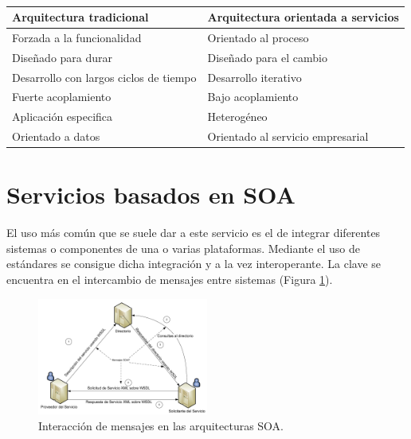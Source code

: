 \documentclass[conference]{IEEEtran}
\begin{document}
\begin{table}[!t]
  \renewcommand{\arraystretch}{1.3}
  \caption{}
  \label{tab:soa-vs-trad}
  \centering
  \begin{tabular}{|l|l|}
    \hline
    \textbf{Arquitectura tradicional} & \textbf{Arquitectura orientada
      a servicios}\\
    \hline\hline
    Forzada a la funcionalidad & Orientado al proceso \\\hline
    Diseñado para durar & Diseñado para el cambio\\\hline
    Desarrollo con largos ciclos de tiempo & Desarrollo
    iterativo\\\hline
    Fuerte acoplamiento & Bajo acoplamiento \\\hline
    Aplicación especifica & Heterogéneo\\\hline
    Orientado a datos & Orientado al servicio empresarial\\
    \hline
  \end{tabular}
\end{table}



\section{Servicios basados en SOA}
\label{sec:serv-soa-based}

El uso más común que se suele dar a este servicio es el de integrar
diferentes sistemas o componentes de una o varias
plataformas. Mediante el uso de estándares se consigue dicha
integración y a la vez  interoperante. La clave se encuentra en el
intercambio de mensajes entre sistemas (Figura \ref{fig:soa}).

\begin{figure}[!t]
\centering
  \includegraphics[width=0.5\textwidth]{img/soa}
  \caption{Interacción de mensajes en las arquitecturas SOA.}
  \label{fig:soa}
\end{figure}
\end{document}
